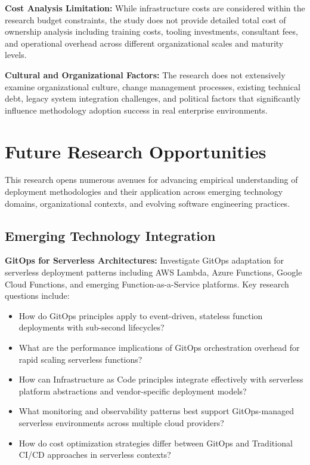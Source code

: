 \textbf{Cost Analysis Limitation:} While infrastructure costs are considered within the research budget constraints, the study does not provide detailed total cost of ownership analysis including training costs, tooling investments, consultant fees, and operational overhead across different organizational scales and maturity levels.

\textbf{Cultural and Organizational Factors:} The research does not extensively examine organizational culture, change management processes, existing technical debt, legacy system integration challenges, and political factors that significantly influence methodology adoption success in real enterprise environments.

\section{Future Research Opportunities}
\label{sec:future_research}

This research opens numerous avenues for advancing empirical understanding of deployment methodologies and their application across emerging technology domains, organizational contexts, and evolving software engineering practices.

\subsection{Emerging Technology Integration}
\label{subsec:emerging_technology}

\textbf{GitOps for Serverless Architectures:} Investigate GitOps adaptation for serverless deployment patterns including AWS Lambda, Azure Functions, Google Cloud Functions, and emerging Function-as-a-Service platforms. Key research questions include:
\begin{itemize}
\item How do GitOps principles apply to event-driven, stateless function deployments with sub-second lifecycles?
\item What are the performance implications of GitOps orchestration overhead for rapid scaling serverless functions?
\item How can Infrastructure as Code principles integrate effectively with serverless platform abstractions and vendor-specific deployment models?
\item What monitoring and observability patterns best support GitOps-managed serverless environments across multiple cloud providers?
\item How do cost optimization strategies differ between GitOps and Traditional CI/CD approaches in serverless contexts?
\end{itemize}

